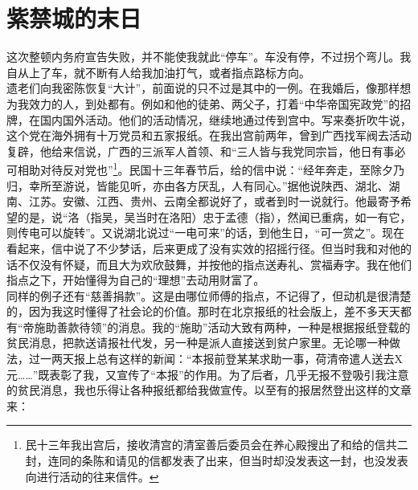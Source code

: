 \fancyhead[RO]{} %
\fancyhead[LE]{} %
\chapter*{紫禁城的末日}
\thispagestyle{empty}
这次整顿内务府宣告失败，并不能使我就此“停车”。车没有停，不过拐个弯儿。我自从上了车，就不断有人给我加油打气，或者指点路标方向。\\

遗老们向我密陈恢复“大计”，前面说的只不过是其中的一例。在我婚后，像那样想为我效力的人，到处都有。例如和他的徒弟、两父子，打着“中华帝国宪政党”的招牌，在国内国外活动。他们的活动情况，继续地通过传到宫中。写来奏折吹牛说，这个党在海外拥有十万党员和五家报纸。在我出宫前两年，曾到广西找军阀去活动复辟，他给来信说，广西的三派军人首领、和“三人皆与我党同宗旨，他日有事必可相助对待反对党也”\footnote{民十三年我出宫后，接收清宫的清室善后委员会在养心殿搜出了和给的信共二封，连同的条陈和请见的信都发表了出来，但当时却没发表这一封，也没发表向进行活动的往来信件。}。民国十三年春节后，给的信中说：“经年奔走，至除夕乃归，幸所至游说，皆能见听，亦由各方厌乱，人有同心。”据他说陕西、湖北、湖南、江苏。安徽、江西、贵州、云南全都说好了，或者到时一说就行。他最寄予希望的是，说“洛（指吴，吴当时在洛阳）忠于孟德（指），然闻已重病，如一有它，则传电可以旋转”。又说湖北说过“一电可来”的话，到他生日，“可一赏之”。现在看起来，信中说了不少梦话，后来更成了没有实效的招摇行径。但当时我和对他的话不仅没有怀疑，而且大为欢欣鼓舞，并按他的指点送寿礼、赏福寿字。我在他们指点之下，开始懂得为自己的“理想”去动用财富了。\\

同样的例子还有“慈善捐款”。这是由哪位师傅的指点，不记得了，但动机是很清楚的，因为我这时懂得了社会论的价值。那时在北京报纸的社会版上，差不多天天都有“帝施助善款待领”的消息。我的“施助”活动大致有两种，一种是根据报纸登载的贫民消息，把款送请报社代发，另一种是派人直接送到贫户家里。无论哪一种做法，过一两天报上总有这样的新闻：“本报前登某某求助一事，荷清帝遣人送去X元……”既表彰了我，又宣传了“本报”的作用。为了后者，几乎无报不登吸引我注意的贫民消息，我也乐得让各种报纸都给我做宣传。以至有的报居然登出这样的文章来：\\

